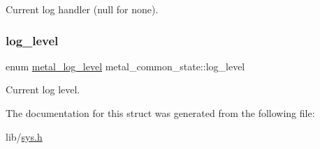 Current log handler (null for none). \mbox{\label{structmetal__common__state_a326c2fb27f8d538f7501d02bd6c3a851}} 
\subsubsection{\texorpdfstring{log\+\_\+level}{log\_level}}
{\footnotesize\ttfamily enum \hyperlink{group__logging_ga4ffa0f4a1339af510aca7f817ee36d82}{metal\+\_\+log\+\_\+level} metal\+\_\+common\+\_\+state\+::log\+\_\+level}

Current log level. 

The documentation for this struct was generated from the following file\+:\begin{DoxyCompactItemize}
\item 
lib/\hyperlink{sys_8h}{sys.\+h}\end{DoxyCompactItemize}

